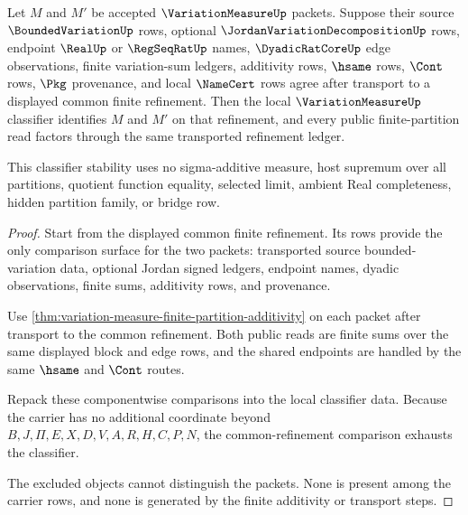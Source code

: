 \begin{theorem}
\label{thm:variation-measure-common-refinement-classifier-stability}
Let $M$ and $M'$ be accepted $\VariationMeasureUp$ packets. Suppose their source $\BoundedVariationUp$ rows, optional $\JordanVariationDecompositionUp$ rows, endpoint $\RealUp$ or $\RegSeqRatUp$ names, $\DyadicRatCoreUp$ edge observations, finite variation-sum ledgers, additivity rows, $\hsame$ rows, $\Cont$ rows, $\Pkg$ provenance, and local $\NameCert$ rows agree after transport to a displayed common finite refinement. Then the local $\VariationMeasureUp$ classifier identifies $M$ and $M'$ on that refinement, and every public finite-partition read factors through the same transported refinement ledger.

This classifier stability uses no sigma-additive measure, host supremum over all partitions, quotient function equality, selected limit, ambient Real completeness, hidden partition family, or bridge row.
\end{theorem}
\begin{proof}
Start from the displayed common finite refinement. Its rows provide the only comparison surface for the two packets: transported source bounded-variation data, optional Jordan signed ledgers, endpoint names, dyadic observations, finite sums, additivity rows, and provenance.

Use \autoref{thm:variation-measure-finite-partition-additivity} on each packet after transport to the common refinement. Both public reads are finite sums over the same displayed block and edge rows, and the shared endpoints are handled by the same $\hsame$ and $\Cont$ routes.

Repack these componentwise comparisons into the local classifier data. Because the carrier has no additional coordinate beyond $B,J,\Pi,E,X,D,V,A,R,H,C,P,N$, the common-refinement comparison exhausts the classifier.

The excluded objects cannot distinguish the packets. None is present among the carrier rows, and none is generated by the finite additivity or transport steps.
\end{proof}

